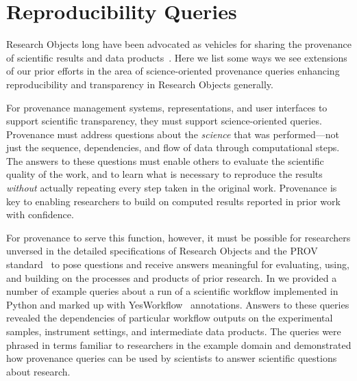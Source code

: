 \section{Reproducibility Queries}\label{sec-transparency}

Research Objects long have been advocated as vehicles for sharing the
	provenance of scientific results and data products~\cite{bechhofer2013whya}.
Here we list some ways we see extensions of our prior efforts in the area
	of science-oriented provenance queries
    enhancing reproducibility and transparency in
	Research Objects generally.

For provenance management systems, representations, and user interfaces to support
	scientific transparency, they must support science-oriented queries.
Provenance must address questions about the \emph{science} that was performed---not just the
	sequence, dependencies, and flow of data through computational steps.
The answers to these questions must enable others to evaluate the scientific quality of the work,
	and to learn what is necessary to
	reproduce the results \emph{without} actually repeating every step taken in the original work.
Provenance is key to enabling researchers to build on computed results reported in prior work with confidence.

For provenance to serve this function, however, it must be possible for researchers unversed in the detailed
	specifications of Research Objects and the PROV standard~\cite{groth2013provoverviewa} to pose
	questions and receive answers meaningful for evaluating, using, and building on the
	processes and products of prior research.
In \cite{mcphillips2015retrospective} we provided a number of example queries about a run of a scientific
	workflow implemented in Python and marked up with YesWorkflow~\cite{mcphillips2015yesworkflowa} annotations.
Answers to these queries revealed the dependencies of particular workflow outputs
	on the experimental samples, instrument settings, and intermediate data products.
The queries were phrased in terms familiar to researchers  in the example domain
	and demonstrated how provenance queries can be used by scientists
	to answer scientific questions about research.

